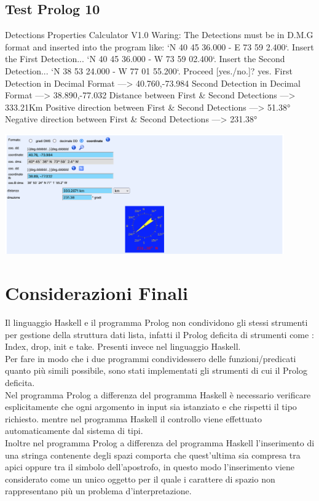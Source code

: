 \documentclass{article}
\begin{document}
\subsection*{Test Prolog 10}
	\begin{spverbatim}
		Detections Properties Calculator V1.0
		Waring: The Detections must be in D.M.G format and inserted into the program like: `N 40 45 36.000 - E 73 59 2.400`.
		Insert the First Detection...
		`N 40 45 36.000 - W 73 59 02.400`.
		Insert the Second Detection...
		`N 38 53 24.000 - W 77 01 55.200`.
		Proceed [yes./no.]?
		yes.
		First Detection in Decimal Format ---> 40.760,-73.984
		Second Detection in Decimal Format ---> 38.890,-77.032
		Distance between First & Second Detections ---> 333.21Km
		Positive direction between First & Second Detections ---> 51.38°
		Negative direction between First & Second Detections ---> 231.38°
	\end{spverbatim}
	\includegraphics[width=0.9\textwidth]{Prolog_Tests/10-Calculation_of_Distant_Coordinates_Check}
\newpage

\section{Considerazioni Finali}
\raggedright

Il linguaggio Haskell e il programma Prolog non condividono gli stessi strumenti per gestione della struttura dati lista, infatti il Prolog deficita di strumenti come : Index, drop, init e take. Presenti invece nel linguaggio Haskell.\\
Per fare in modo che i due programmi condividessero delle funzioni/predicati quanto più simili possibile, sono stati implementati gli strumenti di cui il Prolog deficita.\\
Nel programma Prolog a differenza del programma Haskell è necessario verificare esplicitamente che ogni argomento in input sia istanziato e che rispetti il tipo richiesto. mentre nel programma Haskell il controllo viene effettuato automaticamente dal sistema di tipi.\\
Inoltre nel programma Prolog a differenza del programma Haskell l'inserimento di una stringa contenente degli spazi comporta che quest'ultima sia compresa tra apici oppure tra il simbolo dell'apostrofo, in questo modo l'inserimento viene considerato come un unico oggetto per il quale i carattere di spazio non rappresentano più un problema d'interpretazione.
\end{document}
